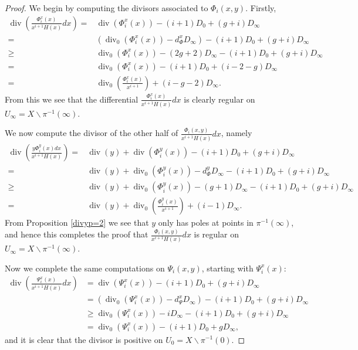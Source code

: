 \documentclass[draft, 11pt]{article} %
\theoremstyle{plain}
\theoremstyle{remark}
\DeclareMathOperator{\di}{div}
\begin{document}
\begin{proof}
We begin by computing the divisors associated to $\Phi_i(x,y)$.
Firstly,
\begin{align*}
\di \left( \frac{\Phi_i^x(x) }{x^{i+1} H(x)}dx \right)  = &  \di(\Phi_i^x(x)) -(i+1)D_0 + (g+i)D_\infty\\
 = & \left( \di_0(\Phi_i^x(x)) -d_\Phi^xD_\infty\right) -(i+1)D_0 + (g+i)D_\infty\\
 \geq & \di_0(\Phi_i^x(x)) - (2g+2)D_\infty - (i+1)D_0 + (g+i)D_\infty \\
 = &  \di_0(\Phi_i^x(x)) - (i+1)D_0 + (i-2-g)D_\infty \\
 =  & \di_0 \left( \frac{\Phi_i^x(x)}{x^{i+1}} \right) + (i-g-2)D_\infty.
\end{align*}
From this we see that the differential $\frac{\Phi_i^x(x)}{x^{i+1}H(x)}dx$ is clearly regular on $U_\infty = X \backslash \pi^{-1}(\infty)$.

We now compute the divisor of the other half of $\frac{\Phi_i(x,y)}{x^{i+1}H(x)}dx$, namely
\begin{align*}
\di\left(\frac{y\Phi_i^y(x) dx}{x^{i+1}H(x)} \right)  = & \di(y) + \di(\Phi_i^y(x)) -(i+1)D_0 + (g+i)D_\infty\\
 = & \di(y) + \di_0(\Phi_i^y(x)) - d_\Phi^yD_\infty -(i+1)D_0 + (g+i)D_\infty \\
 \geq & \di(y) + \di_0(\Phi_i^y(x)) - (g+1)D_\infty - (i+1)D_0 + (g+i)D_\infty \\
 = & \di(y) + \di_0\left(\frac{\Phi_i^y(x)}{x^{i+1}} \right) + (i-1)D_\infty.
\end{align*}
From Proposition \ref{divyp=2} we see that $y$ only has poles at points in $\pi^{-1}(\infty)$, and hence this completes the proof that $\frac{\Phi_i(x,y) }{x^{i+1}H(x)}dx$ is regular on $U_\infty = X \backslash \pi^{-1}(\infty)$.

Now we complete the same computations on $\Psi_i(x,y)$, starting with $\Psi_i^x(x)$:
\begin{align*}
\di\left( \frac{\Psi_i^x(x) }{x^{i+1}H(x)}dx \right)  & =   \di(\Psi_i^x(x))  - (i+1)D_0 + (g+i)D_\infty \\
& = (\di_0(\Psi_i^x(x)) -d_\Psi^xD_\infty) - (i+1)D_0 + (g+i)D_\infty \\
 & \geq   \di_0(\Psi_i^x(x) ) - iD_\infty - (i+1)D_0 + (g+i)D_\infty \\
 & =   \di_0(\Psi_i^x(x)) - (i+1)D_0 + gD_\infty,
\end{align*}
and it is clear that the divisor is positive on $U_0 = X \backslash \pi^{-1}(0)$.


\end{proof}
\end{document}
